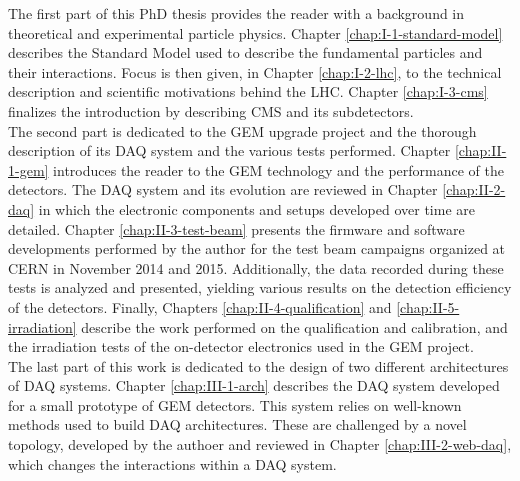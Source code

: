   The first part of this PhD thesis provides the reader with a background in theoretical and experimental particle physics. Chapter \ref{chap:I-1-standard-model} describes the Standard Model used to describe the fundamental particles and their interactions. Focus is then given, in Chapter \ref{chap:I-2-lhc}, to the technical description and scientific motivations behind the LHC. Chapter \ref{chap:I-3-cms} finalizes the introduction by describing CMS and its subdetectors. \\

  The second part is dedicated to the GEM upgrade project and the thorough description of its DAQ system and the various tests performed. Chapter \ref{chap:II-1-gem} introduces the reader to the GEM technology and the performance of the detectors. The DAQ system and its evolution are reviewed in Chapter \ref{chap:II-2-daq} in which the electronic components and setups developed over time are detailed. Chapter \ref{chap:II-3-test-beam} presents the firmware and software developments performed by the author for the test beam campaigns organized at CERN in November 2014 and 2015. Additionally, the data recorded during these tests is analyzed and presented, yielding various results on the detection efficiency of the detectors. Finally, Chapters \ref{chap:II-4-qualification} and \ref{chap:II-5-irradiation} describe the work performed on the qualification and calibration, and the irradiation tests of the on-detector electronics used in the GEM project. \\

  The last part of this work is dedicated to the design of two different architectures of DAQ systems. Chapter \ref{chap:III-1-arch} describes the DAQ system developed for a small prototype of GEM detectors. This system relies on well-known methods used to build DAQ architectures. These are challenged by a novel topology, developed by the authoer and reviewed in Chapter \ref{chap:III-2-web-daq}, which changes the interactions within a DAQ system.
